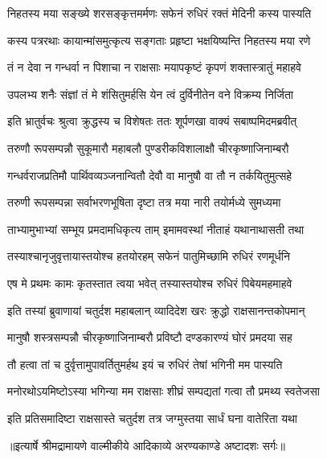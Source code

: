 \twolineshloka
{निहतस्य मया सङ्ख्ये शरसङ्कृत्तमर्मणः}
{सफेनं रुधिरं रक्तं मेदिनी कस्य पास्यति} %

\twolineshloka
{कस्य पत्ररथाः कायान्मांसमुत्कृत्य सङ्गताः}
{प्रहृष्टा भक्षयिष्यन्ति निहतस्य मया रणे} %

\twolineshloka
{तं न देवा न गन्धर्वा न पिशाचा न राक्षसाः}
{मयापकृष्टं कृपणं शक्तास्त्रातुं महाहवे} %

\twolineshloka
{उपलभ्य शनैः संज्ञां तं मे शंसितुमर्हसि}
{येन त्वं दुर्विनीतेन वने विक्रम्य निर्जिता} %

\twolineshloka
{इति भ्रातुर्वचः श्रुत्वा क्रुद्धस्य च विशेषतः}
{ततः शूर्पणखा वाक्यं सबाष्पमिदमब्रवीत्} %

\twolineshloka
{तरुणौ रूपसम्पन्नौ सुकूमारौ महाबलौ}
{पुण्डरीकविशालाक्षौ चीरकृष्णाजिनाम्बरौ} %

\twolineshloka
{गन्धर्वराजप्रतिमौ पार्थिवव्यञ्जनान्वितौ}
{देवौ वा मानुषौ वा तौ न तर्कयितुमुत्सहे} %

\twolineshloka
{तरुणी रूपसम्पन्ना सर्वाभरणभूषिता}
{दृष्टा तत्र मया नारी तयोर्मध्ये सुमध्यमा} %

\twolineshloka
{ताभ्यामुभाभ्यां सम्भूय प्रमदामधिकृत्य ताम्}
{इमामवस्थां नीताहं यथानाथासती तथा} %

\twolineshloka
{तस्याश्चानृजुवृत्तायास्तयोश्च हतयोरहम्}
{सफेनं पातुमिच्छामि रुधिरं रणमूर्धनि} %

\twolineshloka
{एष मे प्रथमः कामः कृतस्तात त्वया भवेत्}
{तस्यास्तयोश्च रुधिरं पिबेयमहमाहवे} %

\twolineshloka
{इति तस्यां ब्रुवाणायां चतुर्दश महाबलान्}
{व्यादिदेश खरः क्रुद्धो राक्षसानन्तकोपमान्} %

\twolineshloka
{मानुषौ शस्त्रसम्पन्नौ चीरकृष्णाजिनाम्बरौ}
{प्रविष्टौ दण्डकारण्यं घोरं प्रमदया सह} %

\twolineshloka
{तौ हत्वा तां च दुर्वृत्तामुपावर्तितुमर्हथ}
{इयं च रुधिरं तेषां भगिनी मम पास्यति} %

\twolineshloka
{मनोरथोऽयमिष्टोऽस्या भगिन्या मम राक्षसाः}
{शीघ्रं सम्पद्यतां गत्वा तौ प्रमथ्य स्वतेजसा} %

\twolineshloka
{इति प्रतिसमादिष्टा राक्षसास्ते चतुर्दश}
{तत्र जग्मुस्तया सार्धं घना वातेरिता यथा} %


{॥इत्यार्षे श्रीमद्रामायणे वाल्मीकीये आदिकाव्ये अरण्यकाण्डे अष्टादशः सर्गः॥}


